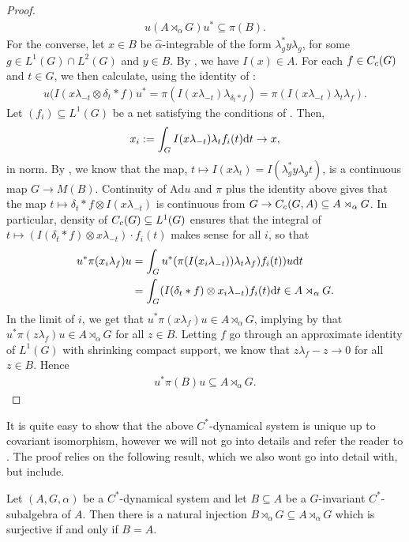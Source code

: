 \begin{proof}
\begin{align*}
		u (A \rtimes_\alpha G)u^* \subseteq \pi(B).
	\end{align*}
	For the converse, let $x \in B$ be $\hat \alpha$-integrable of the form $\lambda_g^* y \lambda_g$, for some $g \in L^1(G) \cap L^2(G)$ and $y \in B$. By , we have $I(x) \in A$. For each $f \in C_c(G)$ and $t \in G$, we then calculate, using the identity of :
	\begin{align*}
		u(I(x\lambda_{-t} \otimes \delta_t \ast f) u^* = \pi(I(x\lambda_{-t})\lambda_{\delta_t \ast f}) = \pi(I(x \lambda_{-t}) \lambda_t \lambda_f).
	\end{align*}
	Let $(f_i) \subseteq L^1(G)$ be a net satisfying the conditions of . Then, 
	\begin{align*}
		x_i := \int_G I(x \lambda_{-t}) \lambda_t f_i(t) \mathrm{d} t \to x,
	\end{align*}
	in norm. By , we know that the map, $t \mapsto I(x\lambda_t)=I(\lambda_g^* y \lambda_g t)$, is a continuous map $G \to M(B)$. Continuity of $\mathrm{Ad} u$ and $\pi$ plus the identity above gives that the map $t \mapsto \delta_t \ast f \otimes I(x \lambda_{-t}) $ is continuous from $G \to C_c(G,A) \subseteq A \rtimes_\alpha G$. In particular, density of $C_c(G)\subseteq L^1(G)$ ensures that the integral of $t \mapsto (I(\delta_t \ast f) \otimes x \lambda_{-t}) \cdot f_i(t)$ makes sense for all $i$, so that
	\begin{align*}
		u^* \pi(x_i \lambda_f)u &= \int_G u^* (\pi(I(x_i \lambda_{-t})) \lambda_t \lambda_f )f_i(t))u \mathrm{d} t \\
		&= \int_G (I(\delta_t \ast f) \otimes x_i \lambda_{-t} ) f_i(t) \mathrm{d} t \in A \rtimes_\alpha G.
	\end{align*}
	In the limit of $i$, we get that $u^* \pi(x \lambda_f) u \in A \rtimes_\alpha G$, implying by  that $u^* \pi(z \lambda_f) u \in A \rtimes_\alpha G$ for all $z \in B$. Letting $f$ go through an approximate identity of $L^1(G)$ with shrinking compact support, we know that $z\lambda_f - z \to 0$ for all $z \in B$. Hence
	\begin{align*}
		u^* \pi(B) u \subseteq A \rtimes_\alpha G.
	\end{align*}	
\end{proof}
It is quite easy to show that the above $C^*$-dynamical system is unique up to covariant isomorphism, however we will not go into details and refer the reader to \cite[Theorem 2.9]{olesenpedersen1}. The proof relies on the following result, which we also wont go into detail with, but include.
\begin{lemma}%
	Let $(A, G, \alpha)$ be a $C^*$-dynamical system and let $B \subseteq A$ be a $G$-invariant $C^*$-subalgebra of $A$. Then there is a natural injection $B \rtimes_\alpha G \subseteq A \rtimes_\alpha G$ which is surjective if and only if $B = A$.
\end{lemma}

